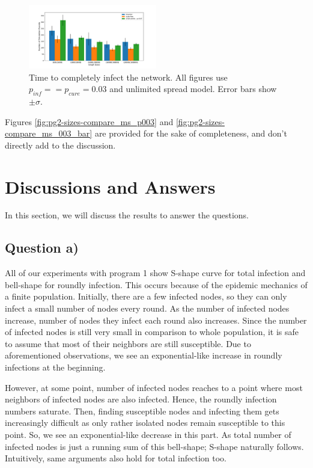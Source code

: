 \documentclass[conference]{IEEEtran}
\begin{document}
\begin{figure}[htb]
  \begin{center}
	\includegraphics[width=0.5\textwidth]{img/pg1-sizes-compare_ms_003_bar.pdf}
  \end{center}
	\caption{Time to completely infect the network. All figures use $p_{inf} =  = p_{cure} = 0.03$ and unlimited spread model. Error bars show $\pm \sigma$.}
	\label{fig:pg2-sizes-compare_ms_003_bar}
\end{figure}

Figures \autoref{fig:pg2-sizes-compare_ms_p003} and \autoref{fig:pg2-sizes-compare_ms_003_bar} are provided for the sake of completeness, and don't directly add to the discussion.

\section{Discussions and Answers}\label{sec:disc-answers}

In this section, we will discuss the results to answer the questions.

\subsection{Question a)}\label{sec:question-a}

All of our experiments with program 1 show S-shape curve for total infection and bell-shape for roundly infection. This occurs because of the epidemic mechanics of a finite population. Initially, there are a few infected nodes, so they can only infect a small number of nodes every round. As the number of infected nodes increase, number of nodes they infect each round also increases. Since the number of infected nodes is still very small in comparison to whole population, it is safe to assume that most of their neighbors are still susceptible. Due to aforementioned observations, we see an exponential-like increase in roundly infections at the beginning.

However, at some point, number of infected nodes reaches to a point where most neighbors of infected nodes are also infected. Hence, the roundly infection numbers saturate. Then, finding susceptible nodes and infecting them gets increasingly difficult as only rather isolated nodes remain susceptible to this point. So, we see an exponential-like decrease in this part. As total number of infected nodes is just a running sum of this bell-shape; S-shape naturally follows. Intuitively, same arguments also hold for total infection too.
\end{document}
